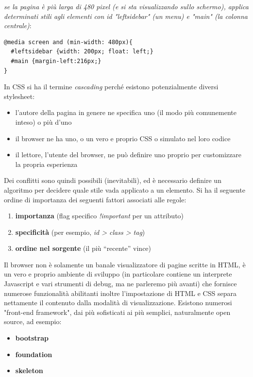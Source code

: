 \documentclass[a4paper,12pt, oneside]{book}
\begin{document}
\textit{se la pagina è più larga di 480
	pixel (e si sta visualizzando sullo schermo), applica
	determinati stili agli elementi con id "leftsidebar" (un menu) e "main" (la colonna centrale)}:
\begin{verbatim}
@media screen and (min-width: 480px){
  #leftsidebar {width: 200px; float: left;}
  #main {margin-left:216px;}
}
\end{verbatim}
In CSS si ha il termine \textit{cascading} perché esistono potenzialmente diversi stylesheet:
\begin{itemize}
	\item l'autore della pagina in genere ne specifica uno (il modo più comunemente inteso) o più d'uno
	\item il browser ne ha uno, o un vero e proprio CSS o simulato nel loro codice
	\item il lettore, l’utente del browser, ne può definire uno proprio per customizzare la propria esperienza
\end{itemize}
Dei conflitti sono quindi possibili (inevitabili), ed è necessario definire un algoritmo per decidere quale stile vada applicato a un elemento. Si ha il seguente ordine di importanza dei seguenti fattori associati alle regole:
\begin{enumerate}
	\item \textbf{importanza} (flag specifico \textit{!important} per un attributo)
	\item \textbf{specificità} (per esempio, \textit{id > class > tag})
	\item \textbf{ordine nel sorgente }(il più “recente” vince)
\end{enumerate}
Il browser non è solamente un banale visualizzatore di pagine
scritte in HTML, è un vero e proprio ambiente di sviluppo (in
particolare contiene un interprete Javascript e vari strumenti di debug, ma ne parleremo più avanti) che fornisce numerose funzionalità abilitanti inoltre l'impostazione di HTML e CSS separa nettamente il contenuto
dalla modalità di visualizzazione. Esistono numerosi "front-end framework", dai più sofisticati ai
più semplici, naturalmente open
source, ad esempio:
\begin{itemize}
	\item \textbf{bootstrap}
	\item \textbf{foundation}
	\item \textbf{skeleton}
\end{itemize}
\end{document}
